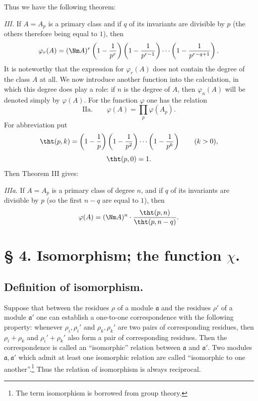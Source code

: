 Thus we have the following theorem:

\emph{III.} If $A=A_p$ is a primary class and if $q$ of its invariants are divisible by $p$ (the others therefore being equal to $1$), then
\[
 \varphi_r(A)=(\Nm A)^r
 \left(1-{1\over p^r}\right)
 \left(1-{1\over p^{r-1}}\right)
 \cdots
 \left(1-{1\over p^{r-q+1}}\right).
\]
It is noteworthy that the expression for $\varphi_r(A)$ does not contain the degree of the class $A$ at all. We now introduce another function into the calculation, in which this degree does play a role: if $n$ is the degree of $A$, then $\varphi_n(A)$ will be denoted simply by $\varphi(A)$. For the function $\varphi$ one has the relation
\[
\text{IIa.}\qquad
 \varphi(A)=\prod_p \varphi(A_p).
\]
For abbreviation put
\[
 \tht(p,k)=\left(1-{1\over p}\right)
 \left(1-{1\over p^2}\right)\cdots
 \left(1-{1\over p^k}\right)\qquad (k>0),
\]
\[
 \tht(p,0)=1.
\]
Then Theorem III gives:

\emph{IIIa.} If $A=A_p$ is a primary class of degree $n$, and if $q$ of its invariants are divisible by $p$ (so the first $n-q$ are equal to $1$), then
\[
 \varphi(A)=(\Nm A)^n\cdot {\tht(p,n)\over \tht(p,n-q)}.
\]


\section*{§ 4. Isomorphism; the function $\chi$.}

\subsection*{Definition of isomorphism.}

Suppose that between the residues $\rho$ of a module $\mathfrak a$ and the residues $\rho'$ of a module $\mathfrak a'$ one can establish a one-to-one correspondence with the following property: whenever $\rho_i,\rho_i'$ and $\rho_k,\rho_k'$ are two pairs of corresponding residues, then $\rho_i+\rho_k$ and $\rho_i'+\rho_k'$ also form a pair of corresponding residues. Then the correspondence is called an ``isomorphic'' relation between $\mathfrak a$ and $\mathfrak a'$. Two modules $\mathfrak a,\mathfrak a'$ which admit at least one isomorphic relation are called ``isomorphic to one another''.\footnote{The term isomorphism is borrowed from group theory.} Thus the relation of isomorphism is always reciprocal.


